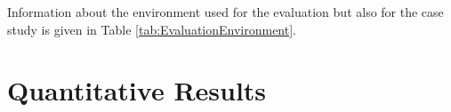 

Information about the environment used for the evaluation but also for the case study 
is given in Table \ref{tab:EvaluationEnvironment}.





\section{Quantitative Results}

